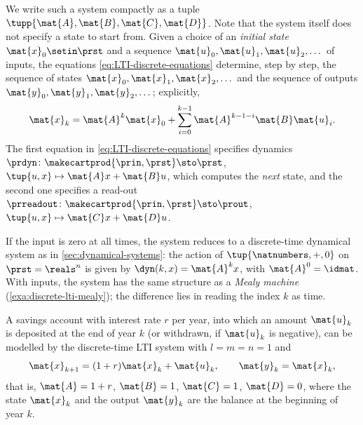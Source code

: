 We write such a system compactly as a tuple $\tupp{\mat{A}, \mat{B}, \mat{C}, \mat{D}}$.
Note that the system itself does not specify a state to start from.
Given a choice of an \emph{initial state} $\mat{x}_0 \setin \prst$ and a sequence $\mat{u}_0, \mat{u}_1, \mat{u}_2, \dots$ of inputs, the equations \cref{eq:LTI-discrete-equations} determine, step by step, the sequence of states $\mat{x}_0, \mat{x}_1, \mat{x}_2, \dots$ and the sequence of outputs $\mat{y}_0, \mat{y}_1, \mat{y}_2, \dots$; explicitly,
\begin{equation}
    \mat{x}_k = \mat{A}^k \mat{x}_0 + \sum_{i=0}^{k-1} \mat{A}^{k-1-i} \mat{B} \mat{u}_i.
\end{equation}
The first equation in \cref{eq:LTI-discrete-equations} specifies dynamics $\prdyn \colon \makecartprod{\prin, \prst} \sto \prst$, $\tup{u, x} \mapsto \mat{A}x + \mat{B}u$, which computes the \emph{next} state, and the second one specifies a read-out $\prreadout \colon \makecartprod{\prin, \prst} \sto \prout$, $\tup{u, x} \mapsto \mat{C}x + \mat{D}u$.

If the input is zero at all times, the system reduces to a discrete-time dynamical system as in \cref{sec:dynamical-systems}: the action of $\tup{\natnumbers, +, 0}$ on $\prst = \reals^n$ is given by $\dyn(k, x) = \mat{A}^k x$, with $\mat{A}^0 = \idmat$.
With inputs, the system has the same structure as a \emph{Mealy machine} (\cref{exa:discrete-lti-mealy}); the difference lies in reading the index $k$ as time.

\begin{example}
    \label{exa:savings-account}
    A savings account with interest rate $r$ per year, into which an amount $\mat{u}_k$ is deposited at the end of year $k$ (or withdrawn, if $\mat{u}_k$ is negative), can be modelled by the discrete-time LTI system with $l = m = n = 1$ and
    \begin{equation}
        \mat{x}_{k+1} = (1 + r) \mat{x}_k + \mat{u}_k, \qquad \mat{y}_k = \mat{x}_k,
    \end{equation}
    that is, $\mat{A} = 1 + r$, $\mat{B} = 1$, $\mat{C} = 1$, $\mat{D} = 0$, where the state $\mat{x}_k$ and the output $\mat{y}_k$ are the balance at the beginning of year $k$.
\end{example}


